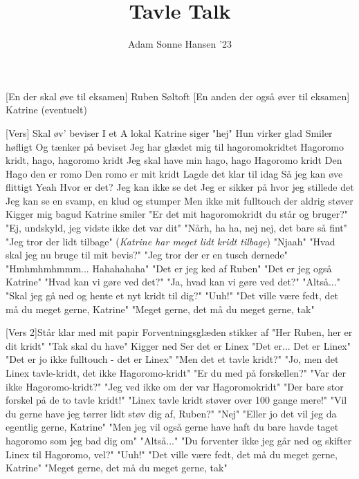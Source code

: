 \documentclass[a4paper,11pt]{article}
\title{Tavle Talk}
\author{Adam Sonne Hansen '23}
\begin{document}
\maketitle

\begin{roles}
[En der skal øve til eksamen] Ruben Søltoft
[En anden der også øver til eksamen] Katrine (eventuelt)
\end{roles}


\begin{song}
  [Vers] 
  Skal øv' beviser
I et A lokal
Katrine siger "hej"
Hun virker glad
Smiler høfligt
Og tænker på beviset
Jeg har glædet mig til hagoromokridtet
Hagoromo kridt, hago, hagoromo kridt
Jeg skal have min hago, hago
Hagoromo kridt
Den Hago den er romo
Den romo er mit kridt
Lagde det klar til idag
Så jeg kan øve flittigt
Yeah
Hvor er det?
Jeg kan ikke se det
Jeg er sikker på hvor jeg stillede det
Jeg kan se en svamp, en klud og stumper
Men ikke mit fulltouch der aldrig støver
Kigger mig bagud
Katrine smiler
"Er det mit hagoromokridt du står og bruger?"
"Ej, undskyld, jeg vidste ikke det var dit"
"Nårh, ha ha, nej nej, det bare så fint"
"Jeg tror der lidt tilbage" (\textit{Katrine har meget lidt kridt tilbage})
"Njaah"
"Hvad skal jeg nu bruge til mit bevis?"
"Jeg tror der er en tusch dernede"
"Hmhmhmhmmm... Hahahahaha"
"Det er jeg ked af Ruben"
"Det er jeg også Katrine"
"Hvad kan vi gøre ved det?"
"Ja, hvad kan vi gøre ved det?"
"Altså..."
"Skal jeg gå ned og hente et nyt kridt til dig?"
"Uuh!"
"Det ville være fedt, det må du meget gerne, Katrine"
"Meget gerne, det må du meget gerne, tak"

[Vers 2]Står klar med mit papir
Forventningsglæden stikker af
"Her Ruben, her er dit kridt"
"Tak skal du have"
Kigger ned
Ser det er Linex
"Det er... Det er Linex"
"Det er jo ikke fulltouch - det er Linex"
"Men det et tavle kridt?"
"Jo, men det Linex tavle-kridt, det ikke Hagoromo-kridt"
"Er du med på forskellen?"
"Var der ikke Hagoromo-kridt?"
"Jeg ved ikke om der var Hagoromokridt"
"Der bare stor forskel på de to tavle kridt!"
"Linex tavle kridt støver over 100 gange mere!"
"Vil du gerne have jeg tørrer lidt støv dig af, Ruben?"
"Nej"
"Eller jo det vil jeg da egentlig gerne, Katrine"
"Men jeg vil også gerne have haft du bare havde taget hagoromo som jeg bad dig om"
"Altså..."
"Du forventer ikke jeg går ned og skifter Linex til Hagoromo, vel?"
"Uuh!"
"Det ville være fedt, det må du meget gerne, Katrine"
"Meget gerne, det må du meget gerne, tak"


\end{song}
\end{document}

